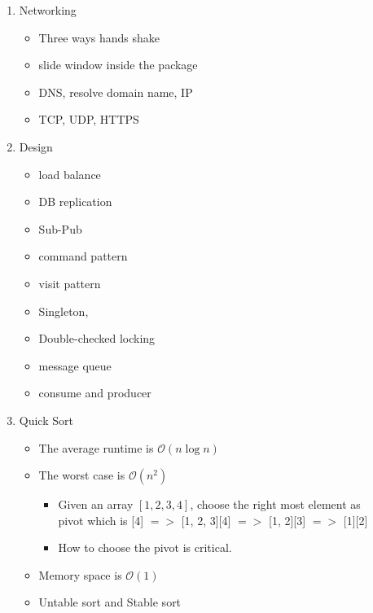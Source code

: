 \documentclass{article}
\begin{document}
\begin{enumerate}
\item Networking
\begin{itemize}
 \item Three ways hands shake 
 \item slide window inside the package
 \item DNS, resolve domain name, IP
 \item TCP, UDP, HTTPS
\end{itemize}

\item Design
\begin{itemize}
 \item load balance
 \item DB replication
 \item Sub-Pub 
 \item command pattern
 \item visit pattern
 \item Singleton, 
 \item Double-checked locking 
 \item message queue
 \item consume and producer
\end{itemize}

\item Quick Sort 
    \begin{itemize}
    \item The average runtime is $\mathcal{O}(n\log{}n)$
    \item The worst case is $\mathcal{O}(n^2)$
        \begin{itemize}
        \item Given an array $[1, 2, 3, 4]$, choose the right most element as \\ 
              pivot which is [4] $=>$ [1, 2, 3][4] $=>$ [1, 2][3] $=>$ [1][2]
        \item How to choose the pivot is critical.
        \end{itemize} 

    \item Memory space is $\mathcal{O}(1)$ 
    \item Untable sort and Stable sort


\end{itemize}
\end{enumerate}
\end{document}

